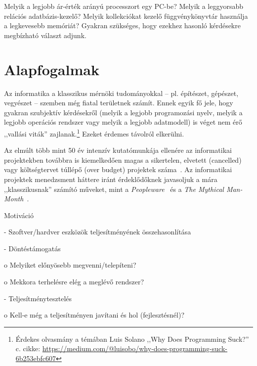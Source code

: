 \label{cha:benchmarking}

\graphicspath{ {./benchmarking/figures/} }

Melyik a legjobb ár-érték arányú processzort egy PC-be? Melyik a leggyorsabb relációs adatbázis-kezelő? Melyik kollekciókat kezelő függvénykönyvtár használja a legkevesebb memóriát? Gyakran szükséges, hogy ezekhez hasonló kérdésekre megbízható választ adjunk.

\section{Alapfogalmak}

\begin{megjegyzes}
	Az informatika a klasszikus mérnöki tudományokkal -- pl. építészet, gépészet, vegyészet -- szemben még fiatal területnek számít. Ennek egyik fő jele, hogy gyakran szubjektív kérdésekről (melyik a legjobb programozási nyelv, melyik a legjobb operációs rendszer vagy melyik a legjobb adatmodell) is véget nem érő ,,vallási viták'' zajlanak.\footnote{Érdekes olvasmány a témában Luis Solano ,,Why Does Programming Suck?'' c. cikke: \url{https://medium.com/@luisobo/why-does-programming-suck-6b253ebfc607}} Ezeket érdemes távolról elkerülni.
	
	Az elmúlt több mint 50 év intenzív kutatómunkája ellenére az informatikai projektekben továbbra is kiemelkedően magas a sikertelen, elvetett (cancelled) vagy költségtervet túllépő (over budget) projektek száma~\cite{HBR:ITProjects}. Az informatikai projektek menedzsment háttere iránt érdeklődőknek javasoljuk a mára ,,klasszikusnak'' számító műveket, mint a \emph{Peopleware}~\cite{demarco2013peopleware} és a \emph{The Mythical Man-Month}~\cite{brooks1995mythical}.
	
\end{megjegyzes}

Motiváció

- Szoftver/hardver eszközök teljesítményének összehasonlítása

- Döntéstámogatás 

o Melyiket előnyösebb megvenni/telepíteni?

o Mekkora terhelésre elég a meglévő rendszer?

- Teljesítménytesztelés 

o Kell‐e még a teljesítményen javítani és hol 
(fejlesztésnél)?

